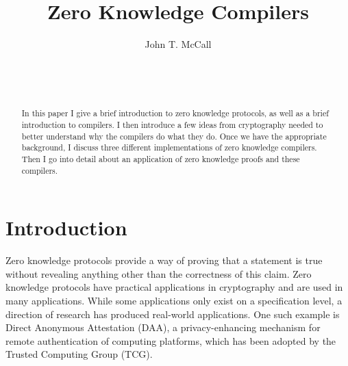 \documentclass{sig-alternate}
\begin{document}

\title{Zero Knowledge Compilers}


\author{
\alignauthor
John T. McCall\\
	\\
	\\
	\\
}

\maketitle

\begin{abstract}
In this paper I give a brief introduction to zero knowledge protocols,
as well as a brief introduction to compilers. I then introduce a few
ideas from cryptography needed to better understand why the compilers do
what they do. Once we have the appropriate background, I discuss three different 
implementations of zero knowledge compilers. Then I go into detail about
an application of zero knowledge proofs and these compilers.
\end{abstract}



\section{Introduction}
	Zero knowledge protocols provide a way of proving that a statement is true
	without revealing anything other than the correctness of this claim. Zero
	knowledge protocols have practical applications in cryptography and
	are used in many applications. While some applications only exist
	on a specification level, a direction of research has produced real-world
	applications. One such example is Direct Anonymous Attestation (DAA),
	a privacy-enhancing mechanism for remote authentication of computing
	platforms, which has been adopted by the Trusted Computing Group (TCG).
	
\end{document}
